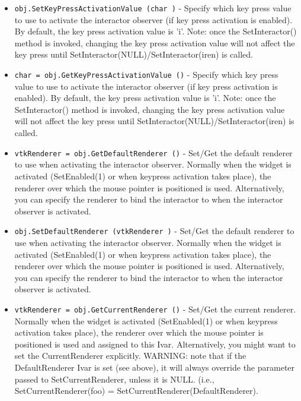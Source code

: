 \begin{itemize}
\item  \verb|obj.SetKeyPressActivationValue (char )| -  Specify which key press value to use to activate the interactor observer
 (if key press activation is enabled). By default, the key press
 activation value is 'i'. Note: once the SetInteractor() method is
 invoked, changing the key press activation value will not affect the key
 press until SetInteractor(NULL)/SetInteractor(iren) is called.

\item  \verb|char = obj.GetKeyPressActivationValue ()| -  Specify which key press value to use to activate the interactor observer
 (if key press activation is enabled). By default, the key press
 activation value is 'i'. Note: once the SetInteractor() method is
 invoked, changing the key press activation value will not affect the key
 press until SetInteractor(NULL)/SetInteractor(iren) is called.

\item  \verb|vtkRenderer = obj.GetDefaultRenderer ()| -  Set/Get the default renderer to use when activating the interactor 
 observer. Normally when the widget is activated (SetEnabled(1) or when 
 keypress activation takes place), the renderer over which the mouse
 pointer is positioned is used. Alternatively, you can specify the
 renderer to bind the interactor to when the interactor observer is
 activated. 

\item  \verb|obj.SetDefaultRenderer (vtkRenderer )| -  Set/Get the default renderer to use when activating the interactor 
 observer. Normally when the widget is activated (SetEnabled(1) or when 
 keypress activation takes place), the renderer over which the mouse
 pointer is positioned is used. Alternatively, you can specify the
 renderer to bind the interactor to when the interactor observer is
 activated. 

\item  \verb|vtkRenderer = obj.GetCurrentRenderer ()| -  Set/Get the current renderer. Normally when the widget is activated 
 (SetEnabled(1) or when keypress activation takes place), the renderer
 over which the mouse pointer is positioned is used and assigned to
 this Ivar. Alternatively, you might want to set the CurrentRenderer
 explicitly.
 WARNING: note that if the DefaultRenderer Ivar is set (see above), 
 it will always override the parameter passed to SetCurrentRenderer,
 unless it is NULL.
 (i.e., SetCurrentRenderer(foo) = SetCurrentRenderer(DefaultRenderer).


\end{itemize}
